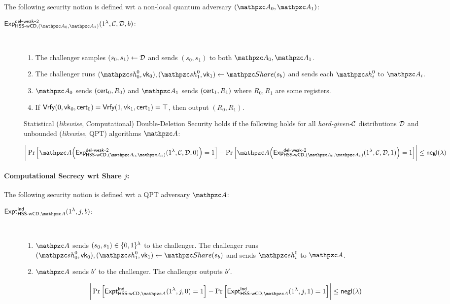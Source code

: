 The following security notion is defined wrt a non-local quantum
adversary $(\qA_0, \qA_1)$:

\begin{description}
\item [$\expc{\HSSwcd, (\qA_0, \qA_1)}{del}{weak}{2}(1^\secp,
\calC, \calD, b)$:]
$ $
\begin{enumerate}
\item The challenger samples $(s_0, s_1) \leftarrow \mathcal{D}$ and
sends $(s_0, s_1)$ to both $\qA_0, \qA_1$.
\item The challenger runs
$(\qsh_0^0, \vk_0), (\qsh_1^0, \vk_1) \gets \Sh(s_b)$ and sends each
$\qsh_i^0$ to $\qA_i$.

\item $\qA_0$ sends $(\mathsf{cert}_0, R_0)$ and $\qA_{1}$ sends
$(\mathsf{cert}_{1}, R_{1})$ where $R_0, R_1$ are some registers.
\item If $\mathsf{Vrfy}(0, \mathsf{vk}_0, \mathsf{cert}_0) = \mathsf{Vrfy}(1, \mathsf{vk}_1, \mathsf{cert}_1)=
\top$, then output $(R_0, R_1)$.
\end{enumerate}

Statistical (\emph{likewise}, Computational) Double-Deletion
Security holds
if the following holds for all \emph{hard-given-$\mathcal{C}$}
distributions $\mathcal{D}$ and unbounded (\emph{likewise}, QPT)
algorithms $\qA$:

$$\bigg\lvert \Pr\Big[\qA\Big(\expc{\HSSwcd, (\qA_0,
\qA_1)}{del}{weak}{2}(1^\secp, \calC, \calD, 0)\Big)=1\Big] -
\Pr\Big[\qA\Big(\expc{\HSSwcd, (\qA_0,
\qA_1)}{del}{weak}{2}(1^\secp, \calC, \calD, 1)\Big)=1\Big]
\bigg\rvert \le \negl(\secp)$$
\end{description}

\paragraph{Computational Secrecy wrt Share $j$:}

The following security notion is defined wrt a QPT
adversary $\qA$:

\begin{description}
\item [$\expa{\HSSwcd, \qA}{ind}(1^\secp, j, b)$:] $ $
\begin{enumerate}
\item $\qA$ sends $(s_0, s_1) \in \{0,1\}^\lambda$
to the challenger. The challenger runs $(\qsh_0^0, \vk_0),
(\qsh_1^0, \vk_1) \leftarrow \Sh(s_b)$ and sends $\qsh_i^0$ to
$\qA$.
\item
$\qA$ sends $b'$ to the challenger. The challenger outputs $b'$.
\end{enumerate}

$$\bigg\lvert \Pr\Big[\expa{\HSSwcd, \qA}{ind}(1^\secp, j, 0)=1\Big]
-
\Pr\Big[\expa{\HSSwcd, \qA}{ind}(1^\secp, j, 1)=1\Big]
\bigg\rvert \le \negl(\secp)$$
\end{description}




